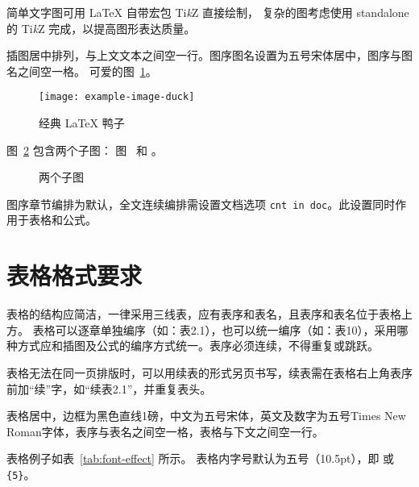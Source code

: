 \documentclass[fontset = mac ms]{seuthesis2024b}
\begin{document}
      简单文字图可用 \LaTeX{} 自带宏包 Ti\textit{k}Z 直接绘制，
      复杂的图考虑使用 standalone 的 Ti\textit{k}Z 完成，以提高图形表达质量。

      插图居中排列，与上文文本之间空一行。图序图名设置为五号宋体居中，图序与图名之间空一格。
      可爱的图~\ref{fig:duck}。
      \begin{figure}[htbp]
        \texttt{[image: example-image-duck]}
        \caption{经典 \LaTeX{} 鸭子}
        \label{fig:duck}
      \end{figure}

      图~\ref{fig:subfigs} 包含两个子图：
      图~ 和 。
      \begin{figure}[htbp]
        \quad
        \caption{两个子图}
        \label{fig:subfigs}
      \end{figure}

      图序章节编排为默认，全文连续编排需设置文档选项 \texttt{cnt in doc}。此设置同时作用于表格和公式。

    \section{表格格式要求}

      表格的结构应简洁，一律采用三线表，应有表序和表名，且表序和表名位于表格上方。
      表格可以逐章单独编序（如：表2.1），也可以统一编序（如：表10），采用哪种方式应和插图及公式的编序方式统一。表序必须连续，不得重复或跳跃。

      表格无法在同一页排版时，可以用续表的形式另页书写，续表需在表格右上角表序前加“续”字，如“续表2.1”，并重复表头。

      表格居中，边框为黑色直线1磅，中文为五号宋体，英文及数字为五号Times New Roman字体，表序与表名之间空一格，表格与下文之间空一行。
    
      表格例子如表~\ref{tab:font-effect} 所示。
      表格内字号默认为五号（10.5pt），即 \texttt{\string\small} 或 \texttt{\string\zihao\{5\}}。
\end{document}
